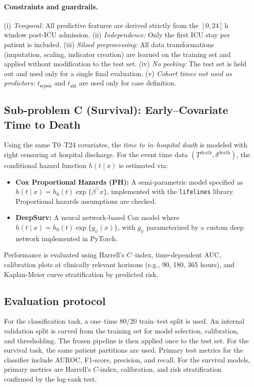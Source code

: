 \paragraph{Constraints and guardrails.}
(i) \emph{Temporal:} All predictive features are derived strictly from the $[0,24]$\,h window post-ICU admission. (ii) \emph{Independence:} Only the first ICU stay per patient is included. (iii) \emph{Siloed preprocessing:} All data transformations (imputation, scaling, indicator creation) are learned on the training set and applied without modification to the test set. (iv) \emph{No peeking:} The test set is held out and used only for a single final evaluation. (v) \emph{Cohort times not used as predictors:} $t_{\text{sepsis}}$ and $t_{\text{aki}}$ are used only for case definition.

\subsection{Sub-problem C (Survival): Early–Covariate Time to Death}
Using the same T0--T24 covariates, the \emph{time to in–hospital death} is modeled with right censoring at hospital discharge. For the event time data $(T^{\mathrm{death}},\delta^{\mathrm{death}})$, the conditional hazard function $h(t\mid x)$ is estimated via:
\begin{itemize}
  \item \textbf{Cox Proportional Hazards (PH):} A semi-parametric model specified as $h(t\mid x)=h_0(t)\exp\{\beta^\top x\}$, implemented with the \texttt{lifelines} library. Proportional hazards assumptions are checked.
  \item \textbf{DeepSurv:} A neural network-based Cox model where $h(t\mid x)=h_0(t)\exp\{g_{\psi}(x)\}$, with $g_\psi$ parameterized by a custom deep network implemented in PyTorch.
\end{itemize}
Performance is evaluated using Harrell's $C$–index, time-dependent AUC, calibration plots at clinically relevant horizons (e.g., 90, 180, 365 hours), and Kaplan-Meier curve stratification by predicted risk.

\subsection{Evaluation protocol}
For the classification task, a one–time 80/20 train–test split is used. An internal validation split is carved from the training set for model selection, calibration, and thresholding. The frozen pipeline is then applied once to the test set. For the survival task, the same patient partitions are used. Primary test metrics for the classifier include AUROC, F1-score, precision, and recall. For the survival models, primary metrics are Harrell's $C$-index, calibration, and risk stratification confirmed by the log-rank test.

